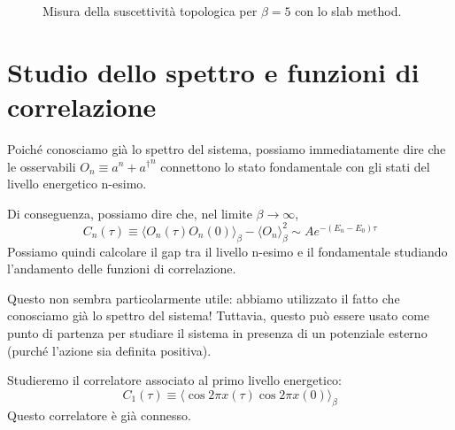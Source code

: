 \documentclass[a4paper,11pt]{article}
\newcommand{\avg}[1]{\langle {#1} \rangle}
\begin{document}
\begin{figure}[htp]
        \caption{Misura della suscettività topologica per $\beta = 5$ con lo slab method.}
        \label{fig:top_slab}
    \end{figure}

    
    
   
    
    \section{Studio dello spettro e funzioni di correlazione}
    
    Poiché conosciamo già lo spettro del sistema, possiamo immediatamente dire che le osservabili $O_n \equiv a^n + {a^\dagger}^n$ connettono lo stato fondamentale con gli stati del livello energetico n-esimo.
    
    Di conseguenza, possiamo dire che, nel limite $\beta \to \infty$, 
    \begin{equation}
        C_n (\tau) \equiv \avg{ O_n(\tau)O_n(0) }_\beta - \avg{O_n}^2_\beta \sim A e^{-(E_n - E_0) \tau}
        \label{eqn:correlator}
    \end{equation}
    Possiamo quindi calcolare il gap tra il livello n-esimo e il fondamentale studiando l'andamento delle funzioni di correlazione. 
    
    Questo non sembra particolarmente utile: abbiamo utilizzato il fatto che conosciamo già lo spettro del sistema! Tuttavia, questo può essere usato come punto di partenza per studiare il sistema in presenza di un potenziale esterno (purché l'azione sia definita positiva). 
    
    Studieremo il correlatore associato al primo livello energetico:
    \begin{equation}
         C_1 (\tau) \equiv \avg{\cos 2\pi x(\tau) \cos 2\pi x(0)}_\beta 
    \end{equation}
    Questo correlatore è già connesso.
    
\end{document}
